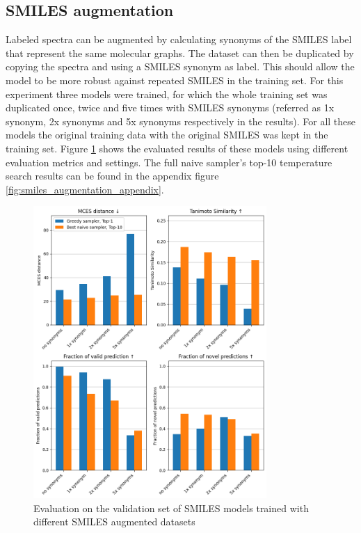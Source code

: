 \subsection{SMILES augmentation}

Labeled spectra can be augmented by calculating synonyms of the SMILES label that represent the same molecular graphs.
The dataset can then be duplicated by copying the spectra and using a SMILES synonym as label.
This should allow the model to be more robust against repeated SMILES in the training set.
For this experiment three models were trained, for which the whole training set was duplicated once, twice and five times with SMILES synonyms (referred as 1x synonym, 2x synonyms and 5x synonyms respectively in the results).
For all these models the original training data with the original SMILES was kept in the training set.
Figure \ref{fig:smiles_augm} shows the evaluated results of these models using different evaluation metrics and settings.
The full naive sampler's top-10 temperature search results can be found in the appendix figure \ref{fig:smiles_augmentation_appendix}.

\begin{figure}[h]
    \centering
    \includegraphics[width=0.79\textwidth]{figures/results/smiles_augmentation_with_tanimoto.png}
    \caption{Evaluation on the validation set of SMILES models trained with different SMILES augmented datasets}
    \label{fig:smiles_augm}
\end{figure}

